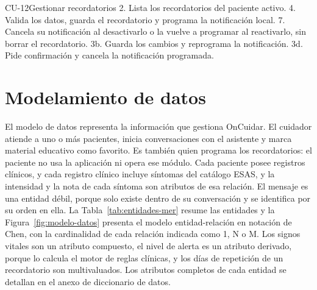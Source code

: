 \begin{table}[H]
\centering
\caption{Especificación del caso de uso CU-12.}
\label{tab:cu-12}
\begin{especificacioncu}{CU-12}{Gestionar recordatorios}
           {2. Lista los recordatorios del paciente activo.}
           {4. Valida los datos, guarda el recordatorio y programa la
           notificación local.}
           {7. Cancela su notificación al desactivarlo o la vuelve a programar al
           reactivarlo, sin borrar el recordatorio.}
    \cufinflujo
           {3b. Guarda los cambios y reprograma la notificación.}
           {3d. Pide confirmación y cancela la notificación programada.}
    \cufinflujo
\end{especificacioncu}
\end{table}

\section[Modelamiento de Datos]{Modelamiento de datos}

El modelo de datos representa la información que gestiona OnCuidar. El cuidador
atiende a uno o más pacientes, inicia conversaciones con el asistente y marca
material educativo como favorito. Es también quien programa los
recordatorios: el paciente no usa la aplicación ni opera ese módulo. Cada
paciente posee registros clínicos, y cada registro clínico incluye síntomas del
catálogo ESAS, y la intensidad y la nota de cada síntoma son
atributos de esa relación. El mensaje es una entidad débil, porque solo existe
dentro de su conversación y se identifica por su orden en ella. La
Tabla~\ref{tab:entidades-mer} resume las entidades y la
Figura~\ref{fig:modelo-datos} presenta el modelo entidad-relación en notación de
Chen, con la cardinalidad de cada relación indicada como 1, N o M. Los signos
vitales son un atributo compuesto, el nivel de alerta es un atributo derivado,
porque lo calcula el motor de reglas clínicas, y los días de repetición de un
recordatorio son multivaluados. Los atributos completos de cada entidad se detallan en el anexo de
diccionario de datos.

